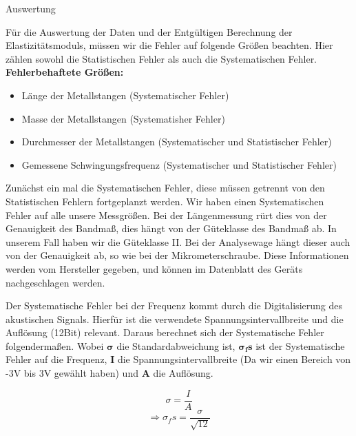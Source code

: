 \documentclass[twoside]{protokoll}
\begin{document}
\begin{aufgabe}{Auswertung}


Für die Auswertung der Daten und der Entgültigen Berechnung der Elastizitätsmoduls, müssen wir die Fehler auf folgende Größen beachten. Hier zählen sowohl die Statistischen Fehler als auch die Systematischen Fehler.\\


\textbf{Fehlerbehaftete Größen:}
\begin{itemize}
\item Länge der Metallstangen (Systematischer Fehler)
\item Masse der Metallstangen (Systematisher Fehler)
\item Durchmesser der Metallstangen (Systematischer und Statistischer Fehler)
\item Gemessene Schwingungsfrequenz (Systematischer und Statistischer Fehler)
\end{itemize}

Zunächst ein mal die Systematischen Fehler, diese müssen getrennt von den Statistischen Fehlern fortgeplanzt werden. Wir haben einen Systematischen Fehler auf alle unsere Messgrößen. Bei der Längenmessung rürt dies von der Genauigkeit des Bandmaß, dies hängt von der Güteklasse des Bandmaß ab. In unserem Fall haben wir die Güteklasse II. Bei der Analysewage  hängt dieser auch von der Genauigkeit ab, so wie bei der Mikrometerschraube. 
Diese Informationen werden vom Hersteller gegeben, und können im Datenblatt des Geräts nachgeschlagen werden. 


Der Systematische Fehler bei der Frequenz kommt durch die Digitalisierung des akustischen Signals. Hierfür ist die verwendete Spannungsintervallbreite und die Auflösung (12Bit) relevant. Daraus berechnet sich der Systematische Fehler folgendermaßen. Wobei $\mathbf{\sigma}$ die Standardabweichung ist, $\mathbf{\sigma_fs}$ ist der Systematische Fehler auf die Frequenz, \textbf{I} die Spannungsintervallbreite (Da wir einen Bereich von -3V bis 3V gewählt haben) und \textbf{A} die Auflösung.

\begin{equation}
         \sigma = \frac{I}{A}
    \end{equation}
\begin{equation}
         \Rightarrow 
         \sigma_fs = \frac{\sigma}{\sqrt{12}}
\end{equation}


\end{aufgabe}
\end{document}
